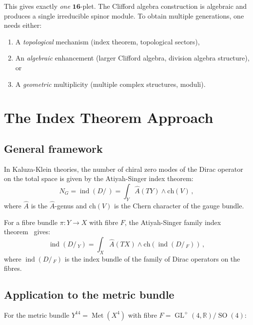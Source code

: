 \documentclass[12pt,a4paper]{article}
\theoremstyle{definition}
\newcommand{\Met}{\operatorname{Met}}
\newcommand{\GL}{\operatorname{GL}}
\newcommand{\SO}{\operatorname{SO}}
\newcommand{\ind}{\operatorname{ind}}
\newcommand{\R}{\mathbb{R}}
\newcommand{\Ahat}{\hat{A}}
\begin{document}
This gives exactly \emph{one} $\mathbf{16}$-plet.
The Clifford algebra construction is algebraic and produces a single irreducible spinor module.
To obtain multiple generations, one needs either:
\begin{enumerate}[nosep]
\item A \emph{topological} mechanism (index theorem, topological sectors),
\item An \emph{algebraic} enhancement (larger Clifford algebra, division algebra structure), or
\item A \emph{geometric} multiplicity (multiple complex structures, moduli).
\end{enumerate}


\section{The Index Theorem Approach}
\label{sec:index}

\subsection{General framework}

In Kaluza-Klein theories, the number of chiral zero modes of the Dirac operator on the total space is given by the Atiyah-Singer index theorem:
\begin{equation}
\label{eq:index}
N_G = \ind(D\!\!\!\!/\,) = \int_Y \Ahat(TY) \wedge \mathrm{ch}(V)\,,
\end{equation}
where $\Ahat$ is the $\hat{A}$-genus and $\mathrm{ch}(V)$ is the Chern character of the gauge bundle.

For a fibre bundle $\pi\colon Y \to X$ with fibre $F$, the Atiyah-Singer family index theorem~\cite{AtiyahSinger1971} gives:
\begin{equation}
\label{eq:family_index}
\ind(D\!\!\!\!/\,_Y) = \int_X \Ahat(TX) \wedge \mathrm{ch}\!\left(\ind(D\!\!\!\!/\,_F)\right)\,,
\end{equation}
where $\ind(D\!\!\!\!/\,_F)$ is the index bundle of the family of Dirac operators on the fibres.

\subsection{Application to the metric bundle}

For the metric bundle $Y^{14} = \Met(X^4)$ with fibre $F = \GL^+(4,\R)/\SO(4)$:
\end{document}
